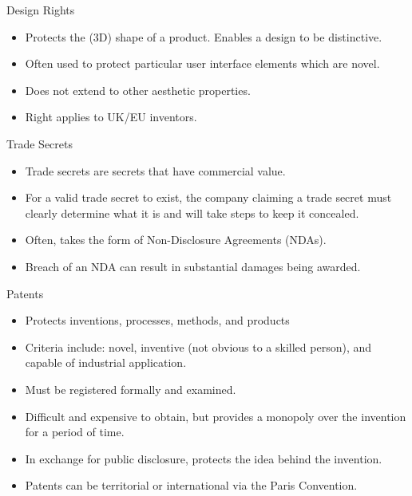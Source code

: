 \begin{frame}{Design Rights}
	\begin{itemize}
		\item Protects the (3D) shape of a product. Enables a design to be distinctive.
		\item Often used to protect particular user interface elements which are novel.
		\item Does not extend to other aesthetic properties.
		\item Right applies to UK/EU inventors.
	\end{itemize}
\end{frame}

\begin{frame}{Trade Secrets}
	\begin{itemize}
		\item Trade secrets are secrets that have commercial value.
		\item For a valid trade secret to exist, the company claiming a trade secret must
		clearly determine what it is and will take steps to keep it concealed.
		\item Often, takes the form of Non-Disclosure Agreements (NDAs).
		\item Breach of an NDA can result in substantial damages being awarded.
	\end{itemize}
\end{frame}

\begin{frame}{Patents}
	\begin{itemize}
		\item Protects inventions, processes, methods, and products
		\item Criteria include: novel, inventive (not obvious to a skilled person), and capable of industrial application.
		\item Must be registered formally and examined.
		\item Difficult and expensive to obtain, but provides a monopoly over the invention for a period of time.
		\item In exchange for public disclosure, protects the idea behind the invention.
		\item Patents can be territorial or international via the Paris Convention.
	\end{itemize}
\end{frame}

